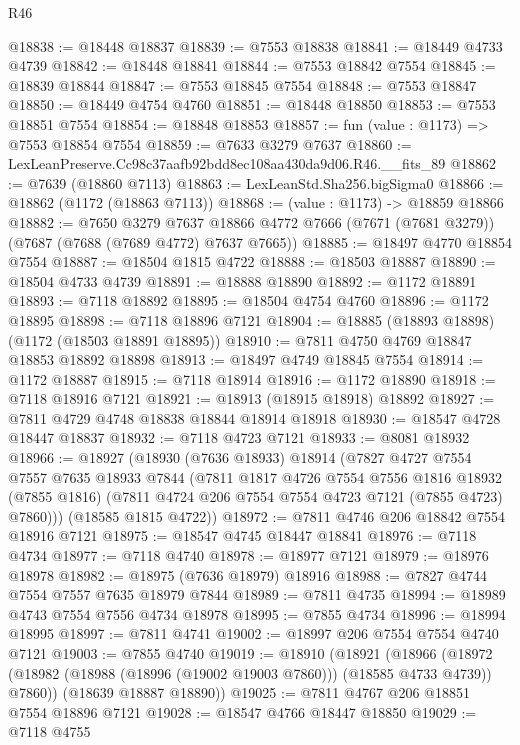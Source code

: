 \begin{lexlean}{R46}
\begin{coremodule}
@18838 := @18448 @18837
@18839 := @7553 @18838
@18841 := @18449 @4733 @4739
@18842 := @18448 @18841
@18844 := @7553 @18842 @7554
@18845 := @18839 @18844
@18847 := @7553 @18845 @7554
@18848 := @7553 @18847
@18850 := @18449 @4754 @4760
@18851 := @18448 @18850
@18853 := @7553 @18851 @7554
@18854 := @18848 @18853
@18857 := fun (value : @1173) => @7553 @18854 @7554
@18859 := @7633 @3279 @7637
@18860 := LexLeanPreserve.Cc98c37aafb92bdd8ec108aa430da9d06.R46.__fits_89
@18862 := @7639 (@18860 @7113)
@18863 := LexLeanStd.Sha256.bigSigma0
@18866 := @18862 (@1172 (@18863 @7113))
@18868 := (value : @1173) -> @18859 @18866
@18882 := @7650
    @3279
    @7637
    @18866
    @4772
    @7666
    (@7671 (@7681 @3279))
    (@7687 (@7688 (@7689 @4772) @7637 @7665))
@18885 := @18497 @4770 @18854 @7554
@18887 := @18504 @1815 @4722
@18888 := @18503 @18887
@18890 := @18504 @4733 @4739
@18891 := @18888 @18890
@18892 := @1172 @18891
@18893 := @7118 @18892
@18895 := @18504 @4754 @4760
@18896 := @1172 @18895
@18898 := @7118 @18896 @7121
@18904 := @18885 (@18893 @18898) (@1172 (@18503 @18891 @18895))
@18910 := @7811 @4750 @4769 @18847 @18853 @18892 @18898
@18913 := @18497 @4749 @18845 @7554
@18914 := @1172 @18887
@18915 := @7118 @18914
@18916 := @1172 @18890
@18918 := @7118 @18916 @7121
@18921 := @18913 (@18915 @18918) @18892
@18927 := @7811 @4729 @4748 @18838 @18844 @18914 @18918
@18930 := @18547 @4728 @18447 @18837
@18932 := @7118 @4723 @7121
@18933 := @8081 @18932
@18966 := @18927
    (@18930
      (@7636 @18933)
      @18914
      (@7827
        @4727
        @7554
        @7557
        @7635
        @18933
        @7844
        (@7811
          @1817
          @4726
          @7554
          @7556
          @1816
          @18932
          (@7855 @1816)
          (@7811 @4724 @206 @7554 @7554 @4723 @7121 (@7855 @4723) @7860)))
      (@18585 @1815 @4722))
@18972 := @7811 @4746 @206 @18842 @7554 @18916 @7121
@18975 := @18547 @4745 @18447 @18841
@18976 := @7118 @4734
@18977 := @7118 @4740
@18978 := @18977 @7121
@18979 := @18976 @18978
@18982 := @18975 (@7636 @18979) @18916
@18988 := @7827 @4744 @7554 @7557 @7635 @18979 @7844
@18989 := @7811 @4735
@18994 := @18989 @4743 @7554 @7556 @4734 @18978
@18995 := @7855 @4734
@18996 := @18994 @18995
@18997 := @7811 @4741
@19002 := @18997 @206 @7554 @7554 @4740 @7121
@19003 := @7855 @4740
@19019 := @18910
    (@18921
      (@18966 (@18972 (@18982 (@18988 (@18996 (@19002 @19003 @7860))) (@18585 @4733 @4739)) @7860))
      (@18639 @18887 @18890))
@19025 := @7811 @4767 @206 @18851 @7554 @18896 @7121
@19028 := @18547 @4766 @18447 @18850
@19029 := @7118 @4755

\end{coremodule}
\end{lexlean}
